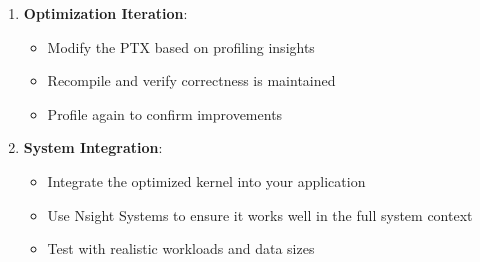 \begin{enumerate}
    \item \textbf{Optimization Iteration}:
    \begin{itemize}
        \item Modify the PTX based on profiling insights
        \item Recompile and verify correctness is maintained
        \item Profile again to confirm improvements
    \end{itemize}
    
    \item \textbf{System Integration}:
    \begin{itemize}
        \item Integrate the optimized kernel into your application
        \item Use Nsight Systems to ensure it works well in the full system context
        \item Test with realistic workloads and data sizes
    \end{itemize}
\end{enumerate}


